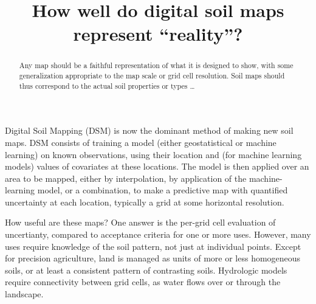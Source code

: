\documentclass[soil, manuscript]{copernicus}
\begin{document}
\title{How well do digital soil maps represent ``reality''?}








\received{}
\pubdiscuss{} %
\revised{}
\accepted{}
\published{}



\maketitle
\tableofcontents

\newpage
\begin{abstract}
Any map should be a faithful representation of what it is designed to show, with some generalization appropriate to the map scale or grid cell resolution.
%
Soil maps should thus correspond to the actual soil properties or types \ldots
%
\end{abstract}

\newpage
\introduction  %

\par
Digital Soil Mapping (DSM) is now the dominant method of making new soil maps.
%
DSM consists of training a model (either geostatistical or machine learning) on known observations, using their location and (for machine learning models) values of covariates at these locations.
%
The model is then applied over an area to be mapped, either by interpolation, by application of the machine-learning model, or a combination, to make a predictive map with quantified uncertainty at each location, typically a grid at some horizontal resolution.

\par
How useful are these maps? One answer is the per-grid cell evaluation of uncertianty, compared to acceptance criteria for one or more uses.
%
However, many uses require knowledge of the soil pattern, not just at individual points.
%
Except for precision agriculture, land is managed as units of more or less homogeneous soils, or at least a consistent pattern of contrasting soils.
%
Hydrologic models require connectivity between grid cells, as water flows over or through the landscape.
\end{document}

